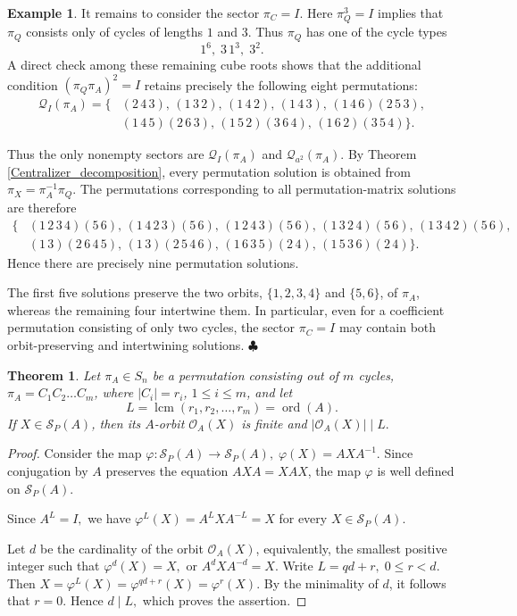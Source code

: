 \documentclass{article}
\newtheorem{theorem}{Theorem}[section]
\theoremstyle{definition}\newtheorem{example}{Example}[section]
\def\Q{{\mathcal{Q}}}
\begin{document}
\begin{example}
		It remains to consider the sector $\pi_C=I$. Here $\pi_Q^3=I$ implies that $\pi_Q$ consists only of cycles of lengths $1$ and $3$. Thus $\pi_Q$ has one of the cycle types
		$$
		1^6,\; 3\,1^3,\; 3^2.
		$$
		A direct check among these remaining cube roots shows that the
		additional condition $(\pi_Q \pi_A)^2=I$ retains precisely the following eight permutations:
		\begin{align*}
			\Q_{I}(\pi_A)=\{&
			(2\,4\,3),\,
			(1\,3\,2),\,
			(1\,4\,2),\,
			(1\,4\,3),\,
			(1\,4\,6)(2\,5\,3),\\
			&(1\,4\,5)(2\,6\,3),\,
			(1\,5\,2)(3\,6\,4),\,
			(1\,6\,2)(3\,5\,4)
			\}.
		\end{align*}
		
		Thus the only nonempty sectors are $\Q_{I}(\pi_A)$ and $\Q_{a^2}(\pi_A).$
		By Theorem \ref{Centralizer_decomposition}, every permutation solution
		is obtained from $\pi_X=\pi_A^{-1}\pi_Q.$
		The permutations corresponding to all permutation-matrix solutions are therefore
		\begin{align*}
			\{&
			(1\,2\,3\,4)(5\,6),\,
			(1\,4\,2\,3)(5\,6),\,
			(1\,2\,4\,3)(5\,6),\,
			(1\,3\,2\,4)(5\,6),\,
			(1\,3\,4\,2)(5\,6),\\
			&(1\,3)(2\,6\,4\,5),\,
			(1\,3)(2\,5\,4\,6),\,
			(1\,6\,3\,5)(2\,4),\,
			(1\,5\,3\,6)(2\,4)
			\}.
		\end{align*}
		Hence there are precisely nine permutation solutions.
		
		The first five solutions preserve the two orbits, $\{1,2,3,4\}$ and $\{5,6\}$, of $\pi_A$, whereas the remaining four intertwine them. In particular, even for a coefficient permutation consisting of only two cycles, the sector $\pi_C=I$ may contain both orbit-preserving and intertwining solutions. \hfill$\clubsuit$
	\end{example}
	
	\begin{theorem}
		Let $\pi_A\in S_n$ be a permutation consisting out of $m$ cycles, $\pi_A=C_1C_2\dots C_m$, where $|C_i|=r_i$, $1\leq i\leq m$, and let
		$$
		L=\operatorname{lcm}(r_1,r_2,\ldots,r_m)
		=\operatorname{ord}(A).
		$$
		If $X\in\mathcal S_P(A)$, then its $A$-orbit $\mathcal O_A(X)$ is finite and
		$|\mathcal O_A(X)|\mid L.$
	\end{theorem}
	
	\begin{proof}
		Consider the map
		$\varphi:\mathcal S_P(A)\longrightarrow\mathcal S_P(A),\;\varphi(X)=AXA^{-1}.$
		Since conjugation by $A$ preserves the equation $AXA=XAX$, the map
		$\varphi$ is well defined on $\mathcal S_P(A)$.
		
		Since $A^L=I,$ we have $\varphi^L(X)=A^LXA^{-L}=X$ for every $X\in\mathcal S_P(A)$.
		
		Let $d$ be the cardinality of the orbit $\mathcal O_A(X)$, equivalently,
		the smallest positive integer such that $\varphi^d(X)=X,$ or $A^dXA^{-d}=X.$
		Write $L=qd+r,\; 0\leq r<d.$ Then
		$X=\varphi^L(X)=\varphi^{qd+r}(X)=\varphi^r(X).$
		By the minimality of $d$, it follows that $r=0$. Hence $d\mid L,$
		which proves the assertion.
	\end{proof}
	
\end{document}
